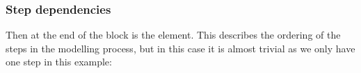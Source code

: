 \subsubsection{Step dependencies}

Then at the end of the  block is the  element. 
This describes the ordering of the steps in the modelling process, but in this case it is 
almost trivial as we only have one step in this example:













